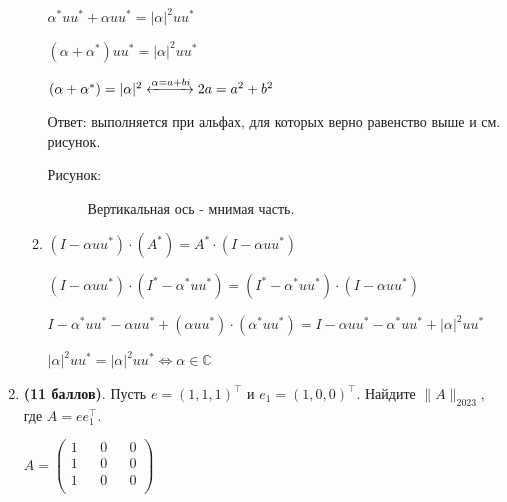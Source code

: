 \documentclass[a4paper, 11pt]{article}
\newcommand{\CC}{\mathbb{C}}
\newcommand{\prob}[1]{\item \textbf{(#1 баллов)}.}
\begin{document}
\begin{enumerate}
\begin{enumerate}
			$\alpha^* u u^* + \alpha u u^* =  |\alpha|^2  u u^*$
			
			$(\alpha + \alpha^*) uu^* = |\alpha|^2  u u^*$
			
			$(\alpha + \alpha^*) = |\alpha|^2 \xleftrightarrow{\alpha = a + bi}  2a = a^2 + b^2$
			
			Ответ: выполняется при альфах, для которых верно равенство выше и см. рисунок.
						
			\bigskip
			
			Рисунок:
			
			\begin{figure}[h]
				\caption{Вертикальная ось - мнимая часть.}
			\end{figure}
		
		\newpage
		
		\item $(I - \alpha u u^*) \cdot (A^*) = A^* \cdot (I - \alpha u u^*)$
		
			$(I - \alpha u u^*) \cdot (I^* - \alpha^* u u^*) = (I^* - \alpha^* u u^*) \cdot (I - \alpha u u^*)$
			
			$I - \alpha^* u u^* - \alpha u u^* + ( \alpha u u^*) \cdot (\alpha^* u u^*) = I - \alpha u u^* - \alpha^* u u^* + |\alpha|^2 u u^*$
			
			$|\alpha|^2 u u^* = |\alpha|^2 u u^* \Longleftrightarrow \alpha \in \CC$
								
		\end{enumerate}
		
		
		
		\prob{11} Пусть $e = (1,1,1)^\top$ и $e_1 = (1,0, 0)^\top$. Найдите $\|A\|_{2023}$, где $A = ee_1^\top$.
		
			$A = \begin{pmatrix}
				1 && 0 && 0 \\ 
				1 && 0 && 0 \\
				1 && 0 && 0 \\
			\end{pmatrix}$
		

\end{enumerate}
\end{document}
